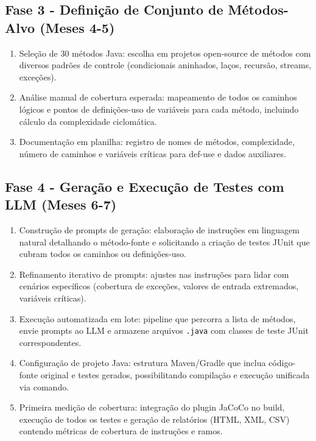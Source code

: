     \subsection{Fase 3 - Definição de Conjunto de Métodos-Alvo (Meses 4-5)}
        \begin{enumerate}
            \item Seleção de 30 métodos Java: escolha em projetos open-source de métodos com diversos padrões de controle (condicionais aninhados, laços, recursão, streams, exceções).
            \item Análise manual de cobertura esperada: mapeamento de todos os caminhos lógicos e pontos de definições-uso de variáveis para cada método, incluindo cálculo da complexidade ciclomática.
            \item Documentação em planilha: registro de nomes de métodos, complexidade, número de caminhos e variáveis críticas para def-use e dados auxiliares.
        \end{enumerate}
    \subsection{Fase 4 - Geração e Execução de Testes com LLM (Meses 6-7)}
        \begin{enumerate}
            \item Construção de prompts de geração: elaboração de instruções em linguagem natural detalhando o método-fonte e solicitando a criação de testes JUnit que cubram todos os caminhos ou definições-uso.
            \item Refinamento iterativo de prompts: ajustes nas instruções para lidar com cenários específicos (cobertura de exceções, valores de entrada extremados, variáveis críticas).
            \item Execução automatizada em lote: pipeline que percorra a lista de métodos, envie prompts ao LLM e armazene arquivos \texttt{.java} com classes de teste JUnit correspondentes.
            \item Configuração de projeto Java: estrutura Maven/Gradle que inclua código-fonte original e testes gerados, possibilitando compilação e execução unificada via comando.
            \item Primeira medição de cobertura: integração do plugin JaCoCo no build, execução de todos os testes e geração de relatórios (HTML, XML, CSV) contendo métricas de cobertura de instruções e ramos.
        \end{enumerate}
